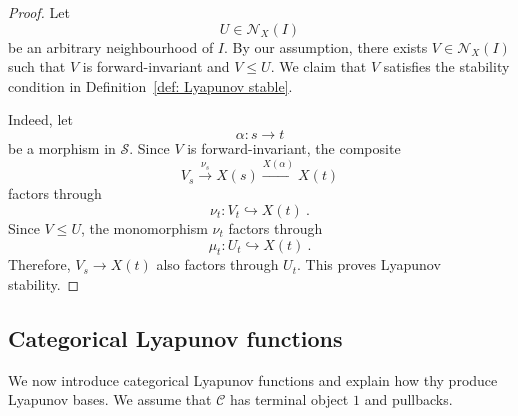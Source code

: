 \documentclass[a4paper,reqno,oneside]{amsart}
\theoremstyle{definition}
\theoremstyle{remark}
\numberwithin{equation}{section}
\begin{document}
	\begin{proof}
		Let
		\begin{equation}
			U \in \mathcal N_X(I)
		\end{equation}
		be an arbitrary neighbourhood of $I$. By our assumption, there exists $V \in \mathcal N_X(I)$ such that $V$ is forward-invariant and $V \leq U$. We claim that $V$ satisfies the stability condition in Definition~\ref{def: Lyapunov stable}.
		
		Indeed, let
		\begin{equation}
			\alpha\colon s\to t
		\end{equation}
		be a morphism in $\mathcal S$. Since $V$ is forward-invariant, the
		composite
		\begin{equation}
			V_s\xrightarrow{\nu_s}X(s)\xrightarrow{X(\alpha)}X(t)
		\end{equation}
		factors through
		\begin{equation}
			\nu_t\colon V_t\hookrightarrow X(t) \ .
		\end{equation}
		Since $V\leq U$, the monomorphism $\nu_t$ factors through
		\begin{equation}
			\mu_t\colon U_t\hookrightarrow X(t) \ .
		\end{equation}
		Therefore, $V_s\longrightarrow X(t)$ also factors through $U_t$. This proves Lyapunov stability.
	\end{proof}
	





\subsection{Categorical Lyapunov functions}

We now introduce categorical Lyapunov functions and explain how thy produce Lyapunov bases. We assume that $\mathcal C$ has terminal object $1$ and pullbacks.
\end{document}
